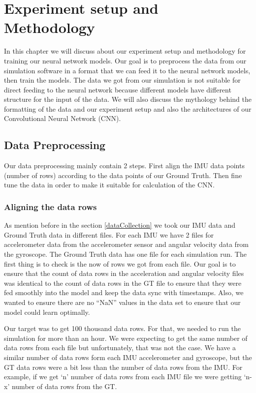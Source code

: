 
\chapter{Experiment setup and Methodology}\label{chapter:experiment_setup}
In this chapter we will discuss about our experiment setup and methodology for training our neural network models. Our goal is to preprocess the data from our simulation software in a format that we can feed it to the neural network models, then train the models. The data we got from our simulation is not suitable for direct feeding to the neural network because different models have different structure for the input of the data. We will also discuss the mythology behind the formatting of the data and our experiment setup and also the architectures of our Convolutional Neural Network (CNN).


\section{Data Preprocessing}

Our data preprocessing mainly contain 2 steps. First align the IMU data points (number of rows) according to the data points of our Ground Truth. Then fine tune the data in order to make it suitable for calculation of the CNN.

\subsection{Aligning the data rows}

As mention before in the section \ref{dataCollection} we took our IMU data and Ground Truth data in different files. For each IMU we have 2 files for accelerometer data from the accelerometer sensor and angular velocity data from the gyroscope. The Ground Truth data has one file for each simulation run.  The first thing is to check is the now of rows we got from each file. Our goal is to ensure that the count of data rows in the acceleration and angular velocity files was identical to the count of data rows in the GT file to ensure that they were fed smoothly into the model and keep the data sync with timestamps. Also, we wanted to ensure there are no “NaN” values in the data set to ensure that our model could learn optimally.

Our target was to get 100 thousand data rows. For that, we needed to run the simulation for more than an hour. We were expecting to get the same number of data rows from each file but unfortunately, that was not the case. We have a similar number of data rows form each IMU accelerometer and gyroscope, but the GT data rows were a bit less than the number of data rows from the IMU. For example, if we get ‘n’ number of data rows from each IMU file we were getting ‘n-x’ number of data rows from the GT.

